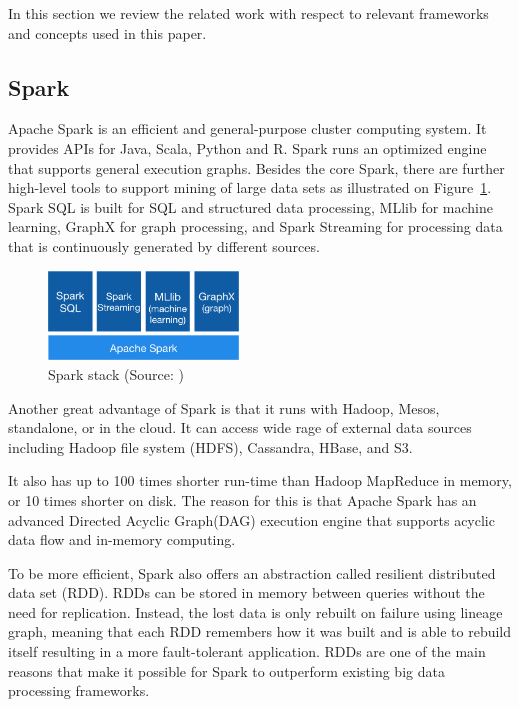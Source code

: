 In this section we review the related work with respect to relevant frameworks and concepts used in this paper.

\subsection{Spark}
Apache Spark is an efficient and general-purpose cluster computing system. It provides APIs for Java, Scala, Python and R. Spark runs an optimized engine that supports general execution graphs. Besides the core Spark, there are further high-level tools to support mining of large data sets as illustrated on Figure~\ref{fig:spark}. Spark SQL is built for SQL and structured data processing, MLlib for machine learning, GraphX for graph processing, and Spark Streaming for processing data that is continuously generated by different sources.
\begin{figure}[h]
    \centering
    \includegraphics[width=0.45\textwidth]{images/spark-stack}
    \caption{Spark stack (Source: \cite{spark})}
    \label{fig:spark}
\end{figure}

Another great advantage of Spark is that it runs with Hadoop, Mesos, standalone, or in the cloud. It can access wide rage of external data sources including Hadoop file system (HDFS), Cassandra, HBase, and S3. 

It also has up to 100 times shorter run-time than Hadoop MapReduce in memory, or 10 times shorter on disk. The reason for this is that Apache Spark has an advanced Directed Acyclic Graph(DAG) execution engine that supports acyclic data flow and in-memory computing.\cite{spark}

To be more efficient, Spark also offers an abstraction called resilient distributed data set (RDD). RDDs can be stored in memory between queries without the need for replication. Instead, the lost data is only rebuilt on failure using lineage graph, meaning that each RDD remembers how it was built and is able to rebuild itself resulting in a more fault-tolerant application. RDDs are one of the main reasons that make it possible for Spark to outperform existing big data processing frameworks. \cite{spark}

